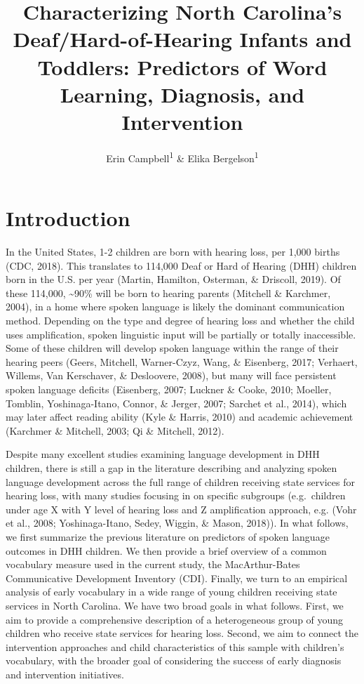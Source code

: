 \documentclass[english,man]{apa6}
\title{Characterizing North Carolina's Deaf/Hard-of-Hearing Infants and Toddlers: Predictors of Word Learning, Diagnosis, and Intervention}
\author{Erin Campbell\textsuperscript{1} \& Elika Bergelson\textsuperscript{1}}
\date{}
\affiliation{\vspace{0.5cm}\textsuperscript{1} Duke University}
\begin{document}
\maketitle

\hypertarget{introduction}{%
\section{Introduction}\label{introduction}}

In the United States, 1-2 children are born with hearing loss, per 1,000 births (CDC, 2018). This translates to 114,000 Deaf or Hard of Hearing (DHH) children born in the U.S. per year (Martin, Hamilton, Osterman, \& Driscoll, 2019). Of these 114,000, \textasciitilde{}90\% will be born to hearing parents (Mitchell \& Karchmer, 2004), in a home where spoken language is likely the dominant communication method. Depending on the type and degree of hearing loss and whether the child uses amplification, spoken linguistic input will be partially or totally inaccessible. Some of these children will develop spoken language within the range of their hearing peers (Geers, Mitchell, Warner-Czyz, Wang, \& Eisenberg, 2017; Verhaert, Willems, Van Kerschaver, \& Desloovere, 2008), but many will face persistent spoken language deficits (Eisenberg, 2007; Luckner \& Cooke, 2010; Moeller, Tomblin, Yoshinaga-Itano, Connor, \& Jerger, 2007; Sarchet et al., 2014), which may later affect reading ability (Kyle \& Harris, 2010) and academic achievement (Karchmer \& Mitchell, 2003; Qi \& Mitchell, 2012).

Despite many excellent studies examining language development in DHH children, there is still a gap in the literature describing and analyzing spoken language development across the full range of children receiving state services for hearing loss, with many studies focusing in on specific subgroups (e.g.~children under age X with Y level of hearing loss and Z amplification approach, e.g. (Vohr et al., 2008; Yoshinaga-Itano, Sedey, Wiggin, \& Mason, 2018)). In what follows, we first summarize the previous literature on predictors of spoken language outcomes in DHH children. We then provide a brief overview of a common vocabulary measure used in the current study, the MacArthur-Bates Communicative Development Inventory (CDI). Finally, we turn to an empirical analysis of early vocabulary in a wide range of young children receiving state services in North Carolina. We have two broad goals in what follows. First, we aim to provide a comprehensive description of a heterogeneous group of young children who receive state services for hearing loss. Second, we aim to connect the intervention approaches and child characteristics of this sample with children's vocabulary, with the broader goal of considering the success of early diagnosis and intervention initiatives.
\end{document}
